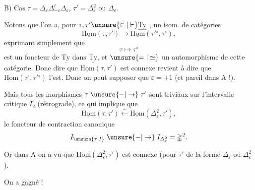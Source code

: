
B) Cas $\tau=\Delta_\varepsilon\Delta_{-\varepsilon}^{\ell}\Delta_\varepsilon$, $\tau'=\mathbb{\Delta}_\varepsilon^2$ ou $\mathbb{\Delta}_\varepsilon$.

Notons que l'on a, pour $\tau,\tau'\unsure{\in|\vdash}\underline{\mathrm{Ty}}$ , un isom. de catégories
\[
\underline{\mathrm{Hom}}(\tau,\tau')\longrightarrow\underline{\mathrm{Hom}}(\tau'{}^\circ,\tau^\circ),
\]
exprimant simplement que
\[
\tau\longmapsto\tau^\circ
\]
est un foncteur  de $\underline{\mathrm{Ty}}$ dans $\underline{\mathrm{Ty}}$, et $\unsure{=|\simeq}$ un automorphisme de cette catégorie. Donc dire que $\underline{\mathrm{Hom}}(\tau,\tau')$ est connexe revient à dire que $\underline{\mathrm{Hom}}(\tau^\circ,\tau'{}^\circ)$ l'est. Donc on peut supposer  que $\varepsilon=+1$ (et pareil dans A !).

\diagram{\begin{tikzcd}[ampersand replacement=\&,column sep=.65em]
\tau:\&{}\arrow[r]\&{}\&{}\arrow[l]\&{}\arrow[l]\&\cdots\&{}\arrow[l]\&{}\arrow[r]\&{}
\arrow[from=1-3,to=1-7,phantom,"{\underbrace{\hspace{3.1cm}}_{\ell}}"']
\end{tikzcd}}

Mais tous les  morphismes $\tau\mathrel{\unsure{-|\to}}\tau'$ sont triviaux sur l'intervalle critique $I_2$ (rétrograde), ce qui implique que
\[
\underline{\mathrm{Hom}}(\tau,\tau')\xleftarrow{\sim}\underline{\mathrm{Hom}}(\Delta_\varepsilon^2,\tau'),
\]
  le foncteur de contraction canonique
\[
I_{\unsure{\tau|I}}\mathrel{\unsure{-|\to}}I_{\Delta_\varepsilon^2}=\mathbb{\Delta}^{2}.
\]

Or dans A on a vu que $\underline{\mathrm{Hom}}(\Delta_\varepsilon^2,\tau')$ est connexe (pour $\tau'$ de la forme $\Delta_\varepsilon$ ou $\Delta_\varepsilon^2$).

On a gagné !

